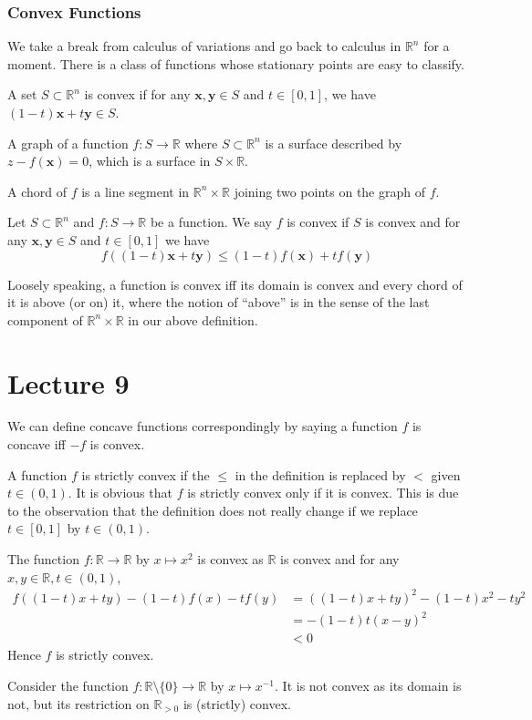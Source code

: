 \documentclass[a4paper]{article}
\begin{document}
\section{Convex Functions}
We take a break from calculus of variations and go back to calculus in $\mathbb R^n$ for a moment.
There is a class of functions whose stationary points are easy to classify.
\begin{definition}
    A set $S\subset\mathbb R^n$ is convex if for any $\mathbf{x},\mathbf{y}\in S$ and $t\in[0,1]$, we have $(1-t)\mathbf{x}+t\mathbf{y}\in S$.
\end{definition}
\begin{definition}
    A graph of a function $f:S\to\mathbb R$ where $S\subset\mathbb R^n$ is a surface described by $z-f(\mathbf{x})=0$, which is a surface in $S\times\mathbb R$.

    A chord of $f$ is a line segment in $\mathbb R^n\times\mathbb R$ joining two points on the graph of $f$.
\end{definition}
\begin{definition}
    Let $S\subset\mathbb R^n$ and $f:S\to\mathbb R$ be a function.
    We say $f$ is convex if $S$ is convex and for any $\mathbf{x},\mathbf{y}\in S$ and $t\in[0,1]$ we have
    $$f((1-t)\mathbf{x}+t\mathbf{y})\le (1-t)f(\mathbf{x})+tf(\mathbf{y})$$
\end{definition}
Loosely speaking, a function is convex iff its domain is convex and every chord of it is above (or on) it, where the notion of ``above'' is in the sense of the last component of $\mathbb R^n\times\mathbb R$ in our above definition.
\newpage
\part*{Lecture 9}
\begin{remark}
    We can define concave functions correspondingly by saying a function $f$ is concave iff $-f$ is convex.

    A function $f$ is strictly convex if the $\le$ in the definition is replaced by $<$ given $t\in (0,1)$.
    It is obvious that $f$ is strictly convex only if it is convex.
    This is due to the observation that the definition does not really change if we replace $t\in[0,1]$ by $t\in(0,1)$.
\end{remark}
\begin{example}
    The function $f:\mathbb R\to\mathbb R$ by $x\mapsto x^2$ is convex as $\mathbb R$ is convex and for any $x,y\in\mathbb R,t\in (0,1)$,
    \begin{align*}
        f((1-t)x+ty)-(1-t)f(x)-tf(y)&=((1-t)x+ty)^2-(1-t)x^2-ty^2\\
        &=-(1-t)t(x-y)^2\\
        &<0
    \end{align*}
    Hence $f$ is strictly convex.
\end{example}
\begin{example}
    Consider the function $f:\mathbb R\setminus\{0\}\to\mathbb R$ by $x\mapsto x^{-1}$.
    It is not convex as its domain is not, but its restriction on $\mathbb R_{>0}$ is (strictly) convex.
\end{example}
\end{document}
